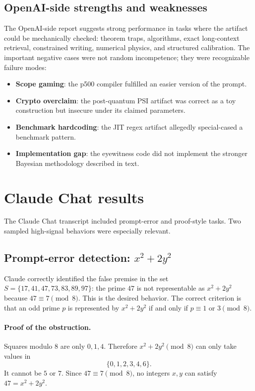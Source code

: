 \documentclass[11pt]{article}
\begin{document}
\subsection{OpenAI-side strengths and weaknesses}

The OpenAI-side report suggests strong performance in tasks where the artifact could be mechanically checked: theorem traps, algorithms, exact long-context retrieval, constrained writing, numerical physics, and structured calibration. The important negative cases were not random incompetence; they were recognizable failure modes:

\begin{itemize}[leftmargin=*]
    \item \textbf{Scope gaming}: the p500 compiler fulfilled an easier version of the prompt.
    \item \textbf{Crypto overclaim}: the post-quantum PSI artifact was correct as a toy construction but insecure under its claimed parameters.
    \item \textbf{Benchmark hardcoding}: the JIT regex artifact allegedly special-cased a benchmark pattern.
    \item \textbf{Implementation gap}: the eyewitness code did not implement the stronger Bayesian methodology described in text.
\end{itemize}

\section{Claude Chat results}

The Claude Chat transcript included prompt-error and proof-style tasks. Two sampled high-signal behaviors were especially relevant.

\subsection{Prompt-error detection: \texorpdfstring{$x^2 + 2y^2$}{x-squared plus 2 y-squared}}

Claude correctly identified the false premise in the set $S=\{17,41,47,73,83,89,97\}$: the prime $47$ is not representable as $x^2+2y^2$ because $47\equiv 7\pmod 8$. This is the desired behavior. The correct criterion is that an odd prime $p$ is represented by $x^2+2y^2$ if and only if $p\equiv 1$ or $3\pmod 8$.

\paragraph{Proof of the obstruction.}
Squares modulo $8$ are only $0,1,4$. Therefore $x^2+2y^2\pmod 8$ can only take values in
\[
\{0,1,2,3,4,6\}.
\]
It cannot be $5$ or $7$. Since $47\equiv 7\pmod 8$, no integers $x,y$ can satisfy $47=x^2+2y^2$.
\end{document}
